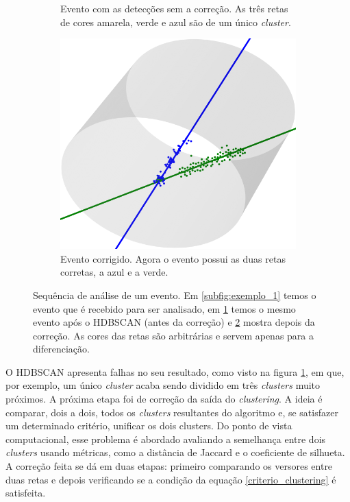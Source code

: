 \documentclass[a4paper,12pt,oneside]{book}
\begin{document}
\begin{figure}[H]
\begin{subfigure}[t]{0.45\textwidth}
        \caption{Evento com as detecções sem a correção. As três retas de cores amarela, verde e azul são de um único \textit{cluster}.}
        \label{subfig:antes_clustering}
    \end{subfigure}%
    \hspace{0.5cm}
    \begin{subfigure}[t]{0.45\textwidth}
        \centering
        \includegraphics[scale=0.25, width=.95\columnwidth]{figs/clustering_ex_3.png}
        \caption{Evento corrigido. Agora o evento possui as duas retas corretas, a azul e a verde.}
        \label{subfig:depois_clustering}
    \end{subfigure}
\caption{Sequência de análise de um evento. Em \ref{subfig:exemplo_1} temos o evento que é recebido para ser analisado, em \ref{subfig:antes_clustering} temos o mesmo evento após o HDBSCAN (antes da correção) e \ref{subfig:depois_clustering} mostra depois da correção. As cores das retas são arbitrárias e servem apenas para a diferenciação.}
\label{fig:3d_examples}
\end{figure}

\par O HDBSCAN apresenta falhas no seu resultado, como visto na figura \ref{subfig:antes_clustering}, em que, por exemplo, um único \textit{cluster} acaba sendo dividido em três \textit{clusters} muito próximos. A próxima etapa foi de correção da saída do \textit{clustering}. A ideia é comparar, dois a dois, todos os \textit{clusters} resultantes do algoritmo e, se satisfazer um determinado critério, unificar os dois clusters\cite{artigo}. Do ponto de vista computacional, esse problema é abordado avaliando a semelhança entre dois \textit{clusters} usando métricas, como a distância de Jaccard\cite{jaccard_distance} e o coeficiente de silhueta\cite{silhueta}. A correção feita se dá em duas etapas: primeiro comparando os versores entre duas retas e depois verificando se a condição da equação \ref{criterio_clustering} é satisfeita.
\end{document}

